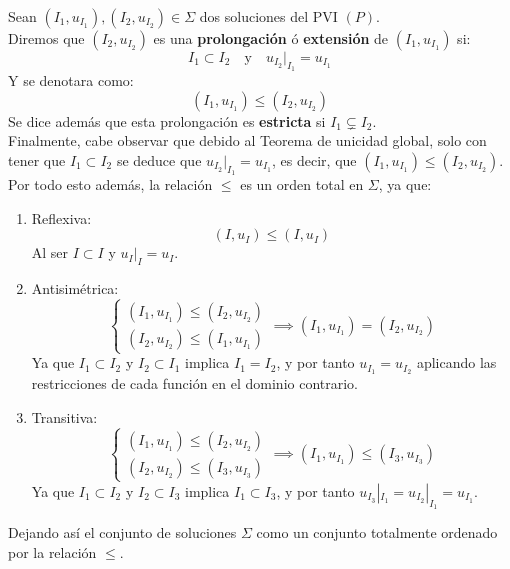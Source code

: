 \begin{definición}
    Sean $(I_1, u_{I_1}), (I_2, u_{I_2}) \in \Sigma$ dos soluciones del PVI $(P)$.\\

    Diremos que $(I_2, u_{I_2})$ es una \textbf{prolongación} ó \textbf{extensión} de $(I_1, u_{I_1})$ si:
    \[
        I_1 \subset I_2 \quad \text{y} \quad u_{I_2}|_{I_1} = u_{I_1}
    \]
    Y se denotara como:
    \[
        (I_1, u_{I_1}) \leq (I_2, u_{I_2})
    \]
    Se dice además que esta prolongación es \textbf{estricta} si $I_1 \subsetneq I_2$.\\

    Finalmente, cabe observar que debido al Teorema de unicidad global, solo con tener que $I_1 \subset I_2$ se deduce que $u_{I_2}|_{I_1} = u_{I_1}$, es decir, que $(I_1, u_{I_1}) \leq (I_2, u_{I_2})$.\\

    Por todo esto además, la relación $\leq$ es un orden total en $\Sigma$, ya que:
    \begin{enumerate}
        \item Reflexiva:
        \[
            (I, u_I) \leq (I, u_I)
        \]
        Al ser $I \subset I$ y $u_I|_I = u_I$.
        \item Antisimétrica:
        \[
            \begin{cases}
                (I_1, u_{I_1}) \leq (I_2, u_{I_2}) \\
                (I_2, u_{I_2}) \leq (I_1, u_{I_1})
            \end{cases}
            \implies
            (I_1, u_{I_1}) = (I_2, u_{I_2})
        \]
        Ya que $I_1 \subset I_2$ y $I_2 \subset I_1$ implica $I_1 = I_2$, y por tanto $u_{I_1} = u_{I_2}$ aplicando las restricciones de cada función en el dominio contrario.
        \item Transitiva:
        \[
            \begin{cases}
                (I_1, u_{I_1}) \leq (I_2, u_{I_2}) \\
                (I_2, u_{I_2}) \leq (I_3, u_{I_3})
            \end{cases}
            \implies
            (I_1, u_{I_1}) \leq (I_3, u_{I_3})
        \]
        Ya que $I_1 \subset I_2$ y $I_2 \subset I_3$ implica $I_1 \subset I_3$, y por tanto $u_{I_3}|_{I_1} = u_{I_2}|_{I_1} = u_{I_1}$.
    \end{enumerate}
    Dejando así el conjunto de soluciones $\Sigma$ como un conjunto totalmente ordenado por la relación $\leq$.
\end{definición}

